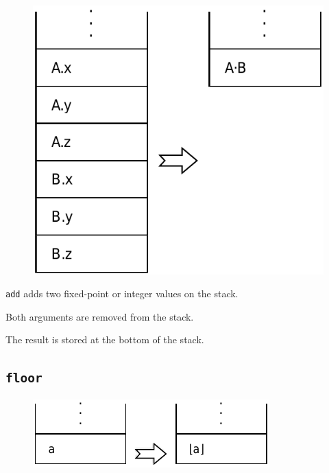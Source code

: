 		\begin{figure}
			\begin{flushright}
				\includegraphics[width=\linewidth]{figure/pdf/i_dot} 
			\end{flushright}
		\end{figure}
	
			\texttt{add} adds two fixed-point or integer values on the stack.
			
			Both arguments are removed from the stack.
			
			The result is stored at the bottom of the stack.
	
	\qquad\qquad
	
	\subsection*{\texttt{floor}}
	
		\begin{figure}
			\begin{flushright}
				\includegraphics[width=\linewidth]{figure/pdf/i_floor} 
			\end{flushright}
		\end{figure}
	
